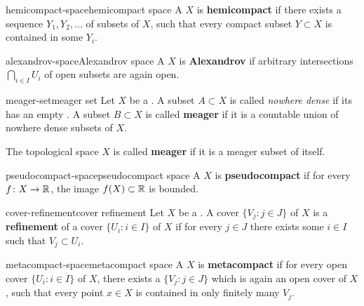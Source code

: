 \begin{topic}{hemicompact-space}{hemicompact space}
    A  $X$ is \textbf{hemicompact} if there exists a sequence $Y_1, Y_2, \ldots$ of  subsets of $X$, such that every compact subset $Y \subset X$ is contained in some $Y_i$.
\end{topic}

\begin{topic}{alexandrov-space}{Alexandrov space}
    A  $X$ is \textbf{Alexandrov} if arbitrary intersections $\bigcap_{i \in I} U_i$ of open subsets are again open.
\end{topic}

\begin{topic}{meager-set}{meager set}
    Let $X$ be a . A subset $A \subset X$ is called \textit{nowhere dense} if its  has an empty . A subset $B \subset X$ is called \textbf{meager} if it is a countable union of nowhere dense subsets of $X$.
    
    The topological space $X$ is called \textbf{meager} if it is a meager subset of itself.
\end{topic}

\begin{topic}{pseudocompact-space}{pseudocompact space}
    A  $X$ is \textbf{pseudocompact} if for every  $f \colon X \to \mathbb{R}$, the image $f(X) \subset \mathbb{R}$ is bounded.
\end{topic}

\begin{topic}{cover-refinement}{cover refinement}
    Let $X$ be a . A cover $\{ V_j : j \in J \}$ of $X$ is a \textbf{refinement} of a cover $\{ U_i : i \in I \}$ of $X$ if for every $j \in J$ there exists some $i \in I$ such that $V_j \subset U_i$.
\end{topic}

\begin{topic}{metacompact-space}{metacompact space}
    A  $X$ is \textbf{metacompact} if for every open cover $\{ U_i : i \in I \}$ of $X$, there exists a  $\{ V_j : j \in J \}$ which is again an open cover of $X$, such that every point $x \in X$ is contained in only finitely many $V_j$.
\end{topic}


